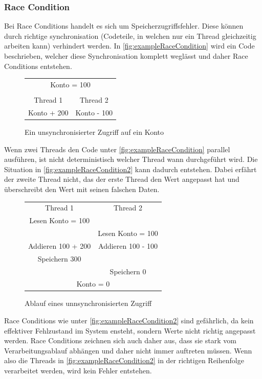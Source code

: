\documentclass[10pt,a4paper]{article}
\begin{document}
\subsubsection{Race Condition}\label{race_conditons}
\begin{flushleft}
Bei Race Conditions handelt es sich um Speicherzugriffsfehler. Diese können durch richtige synchronisation (Codeteile, in welchen nur ein Thread gleichzeitig arbeiten kann) verhindert werden. In \autoref{fig:exampleRaceCondition} wird ein Code beschrieben, welcher diese Synchronisation komplett weglässt und daher Race Conditions entstehen.
\begin{figure}[H]
\centering
\begin{tabular}{|cc|}
\hline
\multicolumn{2}{|c|}{Konto = 100} \\ 
 &  \\ 
Thread 1 & Thread 2 \\ 
Konto + 200 & Konto - 100 \\ 
\hline
\end{tabular}
\caption[Beispiel Race Condition]{Ein unsynchronisierter Zugriff auf ein Konto}
\label{fig:exampleRaceCondition}
\end{figure}
Wenn zwei Threads den Code unter \autoref{fig:exampleRaceCondition} parallel ausführen, ist nicht deterministisch welcher Thread wann durchgeführt wird. Die Situation in \autoref{fig:exampleRaceCondition2} kann dadurch entstehen. Dabei erfährt der zweite Thread nicht, das der erste Thread den Wert angepasst hat und überschreibt den Wert mit seinen falschen Daten.\\\newpage
\begin{figure}[H]
\centering
\begin{tabular}{|cc|}
\hline
Thread 1 & Thread 2\\
Lesen Konto = 100 & \\
& Lesen Konto = 100\\
Addieren 100 + 200 & Addieren 100 - 100\\
Speichern 300 &\\
& Speichern 0\\
\multicolumn{2}{|c|}{Konto = 0}\\
\hline
\end{tabular}
\caption[Race Condition]{Ablauf eines unnsynchronisierten Zugriff}
\label{fig:exampleRaceCondition2}
\end{figure}
Race Conditions wie unter \autoref{fig:exampleRaceCondition2} sind gefährlich, da kein effektiver Fehlzustand im System ensteht, sondern Werte nicht richtig angepasst werden. Race Conditions zeichnen sich auch daher aus, dass sie stark vom Verarbeitungsablauf abhängen und daher nicht immer auftreten müssen. Wenn also die Threads in \autoref{fig:exampleRaceCondition2} in der richtigen Reihenfolge verarbeitet werden, wird kein Fehler entstehen.\\

\end{flushleft}
\end{document}
